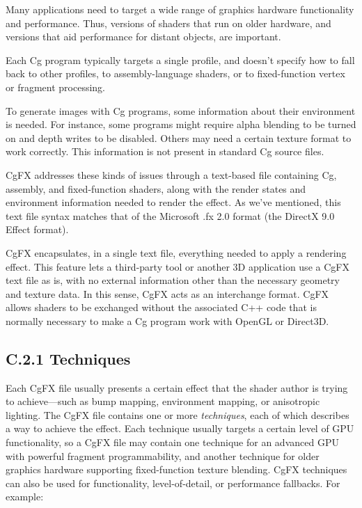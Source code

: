 \documentclass[../main.tex]{subfiles}
\begin{document}
Many applications need to target a wide range of graphics hardware functionality and performance. Thus, versions of shaders that run on older hardware, and versions that aid performance for distant objects, are important.

Each Cg program typically targets a single profile, and doesn't specify how to fall back to other profiles, to assembly-language shaders, or to fixed-function vertex or fragment processing.

To generate images with Cg programs, some information about their environment is needed. For instance, some programs might require alpha blending to be turned on and depth writes to be disabled. Others may need a certain texture format to work correctly. This information is not present in standard Cg source files.

CgFX addresses these kinds of issues through a text-based file containing Cg, assembly, and fixed-function shaders, along with the render states and environment information needed to render the effect. As we've mentioned, this text file syntax matches that of the Microsoft .fx 2.0 format (the DirectX 9.0 Effect format).

CgFX encapsulates, in a single text file, everything needed to apply a rendering effect. This feature lets a third-party tool or another 3D application use a CgFX text file as is, with no external information other than the necessary geometry and texture data. In this sense, CgFX acts as an interchange format. CgFX allows shaders to be exchanged without the associated C++ code that is normally necessary to make a Cg program work with OpenGL or Direct3D.

\subsection{C.2.1 Techniques}

Each CgFX file usually presents a certain effect that the shader author is trying to achieve—such as bump mapping, environment mapping, or anisotropic lighting. The CgFX file contains one or more \textit{techniques}, each of which describes a way to achieve the effect. Each technique usually targets a certain level of GPU functionality, so a CgFX file may contain one technique for an advanced GPU with powerful fragment programmability, and another technique for older graphics hardware supporting fixed-function texture blending. CgFX techniques can also be used for functionality, level-of-detail, or performance fallbacks. For example:
\end{document}

